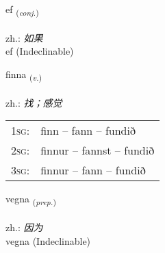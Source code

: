 \documentclass[frontgrid, backgrid]{flacards}\usepackage[]{graphicx}\usepackage[]{xcolor}
\begin{document}
{ef \small{\textsubscript{(\textit{conj.})}} \\[1ex]
\textphonetic{[ɛːf]} \\
zh.: \emph{如果} \\  [2ex]
ef (Indeclinable)}

\renewcommand{\flhead}{\vskip5pt \fboxsep=0pt {\small\bfseries\footnotesize Sagnorð | 动词}}
\renewcommand{\fcfoot}{\vskip5pt \fboxsep=0pt \hspace{2pt}{\small\bfseries\footnotesize 1K}}

\renewcommand{\blhead}{\vskip5pt {\small\bfseries\footnotesize Sagnorð | 动词 }}
\renewcommand{\bcfoot}{\vskip5pt \hspace{2pt}{\small\bfseries\footnotesize 1K}}


{finna \small{\textsubscript{(\textit{v.})}} \\[1ex] %
\textphonetic{[fɪna]} \\
zh.: \emph{找；感觉} \\  [2ex]
\renewcommand*{\arraystretch}{0.8}
\begin{tabular}{p{1cm}l}
\textsc{1sg}: & finn -- fann -- fundið \\ 
\textsc{2sg}: & finnur -- fannst -- fundið \\ 
\textsc{3sg}: & finnur -- fann -- fundið \\ 
\end{tabular}
}


\renewcommand{\flhead}{\vskip5pt \fboxsep=0pt {\small\bfseries\footnotesize Forsetning | 介词}}
\renewcommand{\fcfoot}{\vskip5pt \fboxsep=0pt \hspace{2pt}{\small\bfseries\footnotesize 1K}}

\renewcommand{\blhead}{\vskip5pt {\small\bfseries\footnotesize Forsetning | 介词 }}
\renewcommand{\bcfoot}{\vskip5pt \hspace{2pt}{\small\bfseries\footnotesize 1K}}


{vegna \small{\textsubscript{(\textit{prep.})}} \\[1ex]
\textphonetic{[vɛkna]} \\
zh.: \emph{因为} \\  [2ex]
vegna (Indeclinable)}
\end{document}

